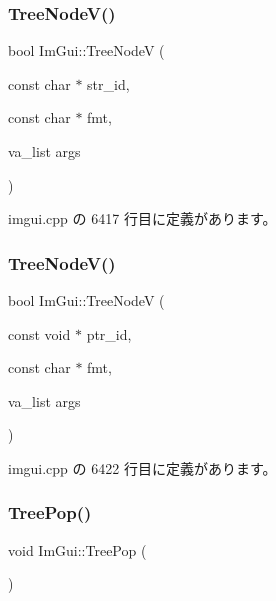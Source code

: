 \subsubsection{\texorpdfstring{Tree\+Node\+V()}{TreeNodeV()}\hspace{0.1cm}{\footnotesize\ttfamily [1/2]}}
{\footnotesize\ttfamily bool Im\+Gui\+::\+Tree\+NodeV (\begin{DoxyParamCaption}\item[{const char $\ast$}]{str\+\_\+id,  }\item[{const char $\ast$}]{fmt,  }\item[{va\+\_\+list}]{args }\end{DoxyParamCaption})}



 imgui.\+cpp の 6417 行目に定義があります。

\mbox{\label{namespace_im_gui_a15320f61ba6b4916af3323bf7844602e}} 
\subsubsection{\texorpdfstring{Tree\+Node\+V()}{TreeNodeV()}\hspace{0.1cm}{\footnotesize\ttfamily [2/2]}}
{\footnotesize\ttfamily bool Im\+Gui\+::\+Tree\+NodeV (\begin{DoxyParamCaption}\item[{const void $\ast$}]{ptr\+\_\+id,  }\item[{const char $\ast$}]{fmt,  }\item[{va\+\_\+list}]{args }\end{DoxyParamCaption})}



 imgui.\+cpp の 6422 行目に定義があります。

\mbox{\label{namespace_im_gui_a41ecf265e5f678c78fc9c30b3cf2077f}} 
\subsubsection{\texorpdfstring{Tree\+Pop()}{TreePop()}}
{\footnotesize\ttfamily void Im\+Gui\+::\+Tree\+Pop (\begin{DoxyParamCaption}{ }\end{DoxyParamCaption})}



